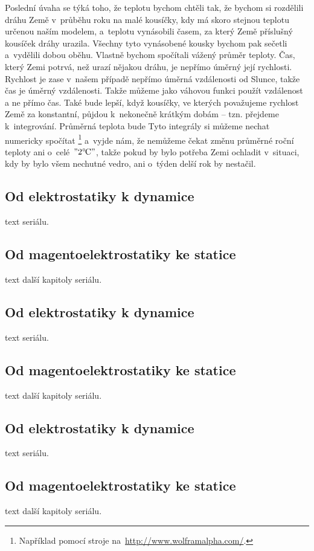 \documentclass[twoside]{fksserie}
\begin{document}
Poslední úvaha se týká toho, že  teplotu bychom chtěli  tak, že
bychom si rozdělili dráhu 
Země v~průběhu roku na malé kousíčky, kdy má skoro stejnou teplotu
určenou naším modelem, a~teplotu vynásobili časem, za který Země příslušný
kousíček dráhy urazila. Všechny tyto vynásobené kousky bychom pak sečetli
a~vydělili dobou oběhu. Vlastně bychom spočítali vážený průměr teploty. 
Čas, který Zemi potrvá, než urazí nějakou dráhu, je 
nepřímo úměrný její rychlosti. Rychlost je zase v~našem případě nepřímo
úměrná vzdálenosti od Slunce, takže čas je úměrný vzdálenosti. Takže
můžeme jako váhovou funkci použít vzdálenost a ne přímo čas. Také
bude lepší, když kousíčky, ve kterých považujeme rychlost Země za konstantní,
půjdou k~nekonečně krátkým dobám -- tzn. přejdeme k~integrování. 
Průměrná teplota bude 
Tyto integrály si můžeme nechat numericky spočítat%
\footnote{Například pomocí stroje na~\url{http://www.wolframalpha.com/}.}
a~vyjde nám, že nemůžeme čekat změnu průměrné roční teploty ani o~celé~$"2 ^\circ\mskip-2mu\mathrm{C}"$, 
takže pokud by bylo potřeba Zemi ochladit v~situaci, kdy by bylo všem 
nechutné vedro, ani o~týden delší rok by nestačil.


\subsection{Od elektrostatiky k dynamice}
text seriálu.

\subsection{Od magentoelektrostatiky ke statice}
text další kapitoly seriálu.

\subsection{Od elektrostatiky k dynamice}
text seriálu.

\subsection{Od magentoelektrostatiky ke statice}
text další kapitoly seriálu.

\subsection{Od elektrostatiky k dynamice}
text seriálu.

\subsection{Od magentoelektrostatiky ke statice}
text další kapitoly seriálu.

\listoffigures


\makefooter %
\end{document}
